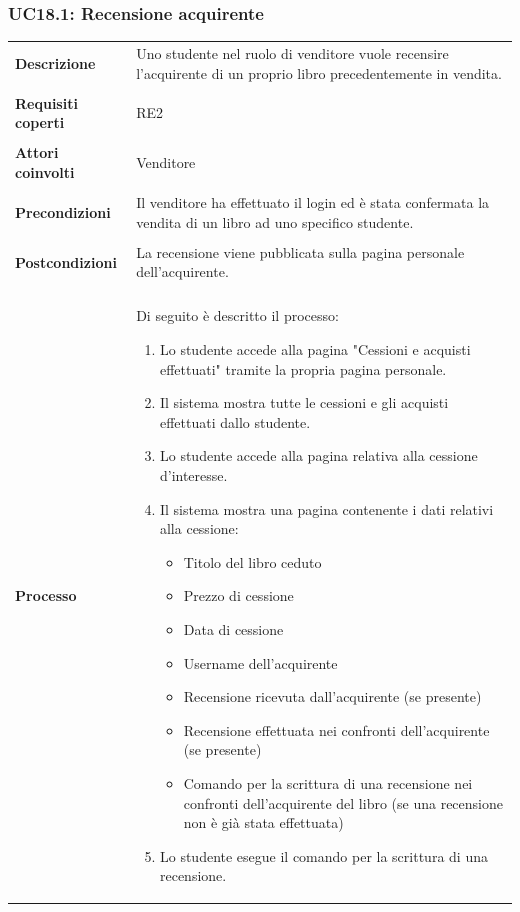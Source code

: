 \documentclass[10pt,a4paper]{article}
\begin{document}
	\subsubsection{UC18.1: Recensione acquirente}
	\begin{tabular}{lp{}}
		\textbf{Descrizione}&Uno studente nel ruolo di venditore vuole recensire l'acquirente di un proprio libro precedentemente in vendita.\\
		\\
		\textbf{Requisiti coperti}&RE2\\
		\\
		\textbf{Attori coinvolti}&Venditore\\
		\\
		\textbf{Precondizioni}&Il venditore ha effettuato il login ed è stata confermata la vendita di un libro ad uno specifico studente.\\
		\\
		\textbf{Postcondizioni}&La recensione viene pubblicata sulla pagina personale dell'acquirente.\\
		\\
		\textbf{Processo}&Di seguito è descritto il processo:
		\begin{enumerate}
			\item Lo studente accede alla pagina "Cessioni e acquisti effettuati" tramite la propria pagina personale.
			\item Il sistema mostra tutte le cessioni e gli acquisti effettuati dallo studente.
			\item Lo studente accede alla pagina relativa alla cessione d'interesse.
			\item Il sistema mostra una pagina contenente i dati relativi alla cessione:
			\begin{itemize}
				\item Titolo del libro ceduto
				\item Prezzo di cessione
				\item Data di cessione
				\item Username dell'acquirente
				\item Recensione ricevuta dall'acquirente (se presente)
				\item Recensione effettuata nei confronti dell'acquirente (se presente)
				\item Comando per la scrittura di una recensione nei confronti dell'acquirente del libro (se una recensione non è già stata effettuata)
			\end{itemize}
			\item Lo studente esegue il comando per la scrittura di una recensione.

\end{enumerate}
\end{tabular}
\end{document}
